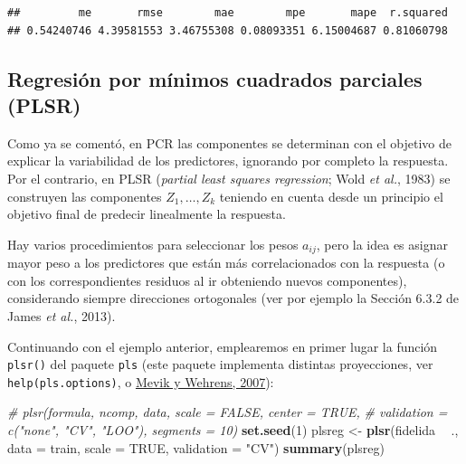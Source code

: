 \documentclass[
]{book}
\newenvironment{Shaded}{\begin{snugshade}}{\end{snugshade}}
\newcommand{\CommentTok}[1]{\textcolor[rgb]{0.56,0.35,0.01}{\textit{#1}}}
\newcommand{\DataTypeTok}[1]{\textcolor[rgb]{0.13,0.29,0.53}{#1}}
\newcommand{\DecValTok}[1]{\textcolor[rgb]{0.00,0.00,0.81}{#1}}
\newcommand{\KeywordTok}[1]{\textcolor[rgb]{0.13,0.29,0.53}{\textbf{#1}}}
\newcommand{\NormalTok}[1]{#1}
\newcommand{\OperatorTok}[1]{\textcolor[rgb]{0.81,0.36,0.00}{\textbf{#1}}}
\newcommand{\OtherTok}[1]{\textcolor[rgb]{0.56,0.35,0.01}{#1}}
\newcommand{\StringTok}[1]{\textcolor[rgb]{0.31,0.60,0.02}{#1}}
\theoremstyle{break}
\theoremstyle{definition}
\theoremstyle{definition}
\theoremstyle{definition}
\theoremstyle{remark}
\begin{document}
\begin{verbatim}
##         me       rmse        mae        mpe       mape  r.squared 
## 0.54240746 4.39581553 3.46755308 0.08093351 6.15004687 0.81060798
\end{verbatim}

\hypertarget{regresiuxf3n-por-muxednimos-cuadrados-parciales-plsr}{%
\subsection{Regresión por mínimos cuadrados parciales (PLSR)}\label{regresiuxf3n-por-muxednimos-cuadrados-parciales-plsr}}

Como ya se comentó, en PCR las componentes se determinan con el objetivo de explicar la variabilidad de los predictores, ignorando por completo la respuesta.
Por el contrario, en PLSR (\emph{partial least squares regression}; Wold \emph{et al.}, 1983) se construyen las componentes \(Z_1, \ldots, Z_k\) teniendo en cuenta desde un principio el objetivo final de predecir linealmente la respuesta.

Hay varios procedimientos para seleccionar los pesos \(a_{ij}\), pero la idea es asignar mayor peso a los predictores que están más correlacionados con la respuesta (o con los correspondientes residuos al ir obteniendo nuevos componentes), considerando siempre direcciones ortogonales (ver por ejemplo la Sección 6.3.2 de James \emph{et al.}, 2013).

Continuando con el ejemplo anterior, emplearemos en primer lugar la función \texttt{plsr()} del paquete \texttt{pls} (este paquete implementa distintas proyecciones, ver \texttt{help(pls.options)}, o \href{https://www.jstatsoft.org/article/view/v018i02}{Mevik y Wehrens, 2007}):

\begin{Shaded}
\begin{Highlighting}[]
\CommentTok{# plsr(formula, ncomp, data, scale = FALSE, center = TRUE, }
\CommentTok{#      validation = c("none", "CV", "LOO"), segments = 10)}
\KeywordTok{set.seed}\NormalTok{(}\DecValTok{1}\NormalTok{)}
\NormalTok{plsreg <-}\StringTok{ }\KeywordTok{plsr}\NormalTok{(fidelida }\OperatorTok{~}\StringTok{ }\NormalTok{., }\DataTypeTok{data =}\NormalTok{ train, }\DataTypeTok{scale =} \OtherTok{TRUE}\NormalTok{, }\DataTypeTok{validation =} \StringTok{"CV"}\NormalTok{)}
\KeywordTok{summary}\NormalTok{(plsreg)}
\end{Highlighting}
\end{Shaded}
\end{document}
